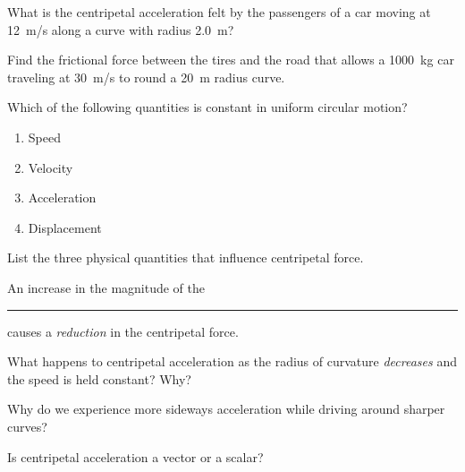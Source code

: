 \documentclass[main-physics.tex]{subfiles}
\begin{document}
\begin{exercise} \label{kTvEZX}
    What is the centripetal acceleration felt by the passengers of a car moving at \SI{12}{m/s} along a curve with radius \SI{2.0}{m}?
\end{exercise}

\begin{exercise} \label{MJm5VE}
    Find the frictional force between the tires and the road that allows a \SI{1000}{kg} car traveling at \SI{30}{m/s} to round a \SI{20}{m} radius curve.
\end{exercise}

\begin{exercise} \label{fsjtBV}
    Which of the following quantities is constant in uniform circular motion?

    \begin{enumerate}[label=\Alph*.]
        \item Speed
        \item Velocity
        \item Acceleration
        \item Displacement
    \end{enumerate}
\end{exercise}

\begin{exercise} \label{GD8Yff}
    List the three physical quantities that influence centripetal force.
\end{exercise}

\begin{exercise} \label{aEtlVz}
    An increase in the magnitude of the \rule{2cm}{0.15mm} causes a \textit{reduction} in the centripetal force.
\end{exercise}

\begin{exercise} \label{5lauZ6}
    What happens to centripetal acceleration as the radius of curvature \textit{decreases} and the speed is held constant? Why?
\end{exercise}

\begin{exercise} \label{KB7t4k}
    Why do we experience more sideways acceleration while driving around sharper curves?
\end{exercise}

\begin{exercise} \label{jb3iGO}
    Is centripetal acceleration a vector or a scalar?
\end{exercise}
\end{document}
